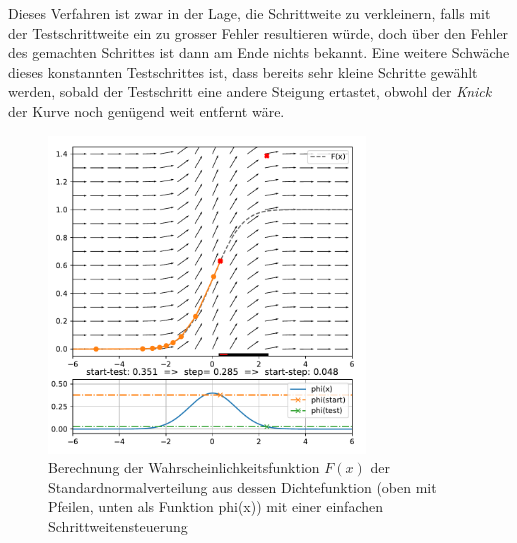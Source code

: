 Dieses Verfahren ist zwar in der Lage, die Schrittweite zu verkleinern, falls mit der Testschrittweite ein zu grosser Fehler resultieren würde,
doch über den Fehler des gemachten Schrittes ist dann am Ende nichts bekannt.
Eine weitere Schwäche dieses konstannten Testschrittes ist, dass bereits sehr kleine Schritte gewählt werden,
sobald der Testschritt eine andere Steigung ertastet, obwohl der \textit{Knick} der Kurve noch genügend weit entfernt wäre.

\begin{figure}
  \centering
  \includegraphics[width=0.75\textwidth]{papers/steps/img/ssc.pdf}
  \caption{Berechnung der Wahrscheinlichkeitsfunktion $F(x)$ der Standardnormalverteilung aus dessen Dichtefunktion
    (oben mit Pfeilen, unten als Funktion phi(x)) mit einer einfachen Schrittweitensteuerung
    \label{buch:steps:examplessc}}
\end{figure}


